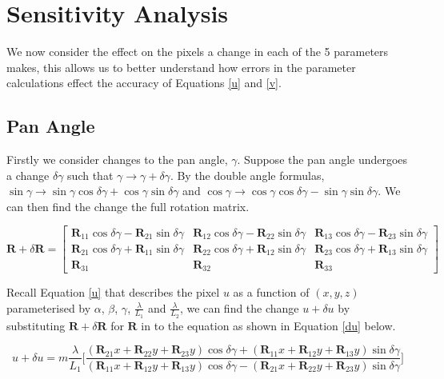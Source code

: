 \documentclass[12pt]{article}
\newcommand{\mtx}[1]{\ensuremath{\mathbf{#1}}}
\begin{document}
\section{Sensitivity Analysis}

We now consider the effect on the pixels a change in each of the 5 parameters makes, this allows us to better understand how errors in the parameter calculations effect the accuracy of Equations \ref{u} and \ref{v}.

\subsection{Pan Angle}
Firstly we consider changes to the pan angle, $\gamma$. Suppose the pan angle undergoes a change $\delta\gamma$ such that $\gamma \rightarrow \gamma + \delta\gamma$. By the double angle formulas, $\sin\gamma\rightarrow\sin\gamma\cos\delta\gamma + \cos\gamma\sin\delta\gamma$ and $\cos\gamma\rightarrow\cos\gamma\cos\delta\gamma - \sin\gamma\sin\delta\gamma$. We can then find the change the full rotation matrix.

\begin{equation}
 \mtx{R} + \delta\mtx{R} =
  \begin{bmatrix}
    \mtx{R}_{11}\cos\delta\gamma - \mtx{R}_{21}\sin\delta\gamma & \mtx{R}_{12}\cos\delta\gamma - \mtx{R}_{22}\sin\delta\gamma & \mtx{R}_{13}\cos\delta\gamma - \mtx{R}_{23}\sin\delta\gamma \\

    \mtx{R}_{21}\cos\delta\gamma + \mtx{R}_{11}\sin\delta\gamma & \mtx{R}_{22}\cos\delta\gamma + \mtx{R}_{12}\sin\delta\gamma & \mtx{R}_{23}\cos\delta\gamma + \mtx{R}_{13}\sin\delta\gamma \\

    \mtx{R}_{31} & \mtx{R}_{32} & \mtx{R}_{33}
 \end{bmatrix}
\end{equation}

Recall Equation \ref{u} that describes the pixel $u$ as a function of $(x,y,z)$ parameterised by $\alpha$, $\beta$, $\gamma$, $\frac{\lambda}{L_1}$ and $\frac{\lambda}{L_2}$, we can find the change $u + \delta u$ by substituting $\mtx{R} + \delta\mtx{R}$ for $\mtx{R}$ in to the equation as shown in Equation \ref{du} below.

\begin{equation}\label{du}
    u + \delta u = m\frac{\lambda}{L_1}
        \bigg[\frac{(\mtx{R}_{21}x + \mtx{R}_{22}y + \mtx{R}_{23}y)\cos\delta\gamma 
                  + (\mtx{R}_{11}x + \mtx{R}_{12}y + \mtx{R}_{13}y)\sin\delta\gamma}
                   {(\mtx{R}_{11}x + \mtx{R}_{12}y + \mtx{R}_{13}y)\cos\delta\gamma -(\mtx{R}_{21}x + \mtx{R}_{22}y + \mtx{R}_{23}y)\sin\delta\gamma}                  
        \bigg]
\end{equation}
\end{document}
